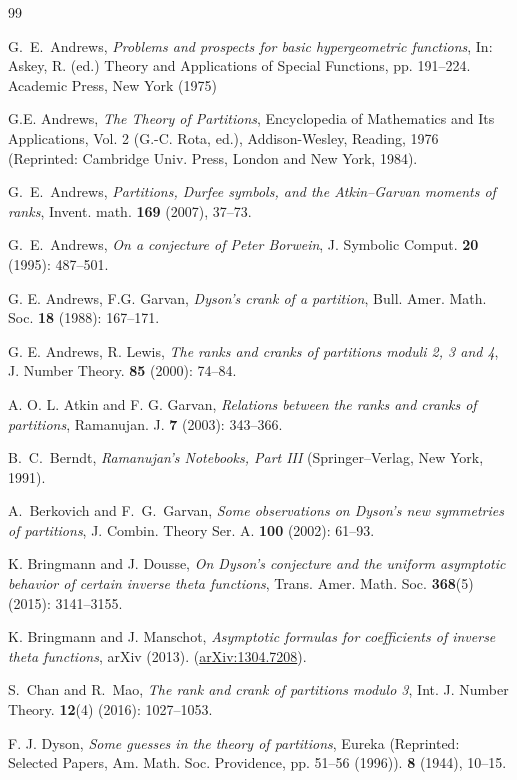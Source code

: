 \documentclass[12pt]{amsart}
\numberwithin{equation}{section}
\theoremstyle{plain}
\theoremstyle{definition}
\begin{document}
\begin{thebibliography}{99}

G.~E.~Andrews, \emph{Problems and prospects for basic hypergeometric functions}, In: Askey, R. (ed.) Theory and Applications of Special Functions, pp. 191--224. Academic Press, New York (1975)

G.E. Andrews, \emph{The Theory of Partitions}, Encyclopedia of Mathematics and Its Applications, Vol. 2 (G.-C. Rota, ed.), Addison-Wesley, Reading, 1976
    (Reprinted: Cambridge Univ. Press, London and New York, 1984).

G.~E.~Andrews, \emph{Partitions, Durfee symbols, and the Atkin--Garvan moments of ranks}, Invent. math. {\bf 169} (2007), 37--73.

G.~E.~Andrews, \emph{On a conjecture of Peter Borwein}, J. Symbolic Comput. {\bf 20} (1995): 487--501.

G. E. Andrews, F.G. Garvan, \emph{Dyson's crank of a partition}, Bull. Amer. Math. Soc. {\bf 18} (1988): 167--171.

G. E. Andrews, R. Lewis, \emph{The ranks and cranks of partitions moduli 2, 3 and 4}, J. Number Theory. {\bf 85} (2000): 74--84.

A. O. L. Atkin and F. G. Garvan, \emph{Relations between the ranks and cranks of partitions}, Ramanujan. J. {\bf 7} (2003): 343--366.

 B.~C.~Berndt, \emph{Ramanujan's Notebooks, Part III} (Springer--Verlag, New York, 1991).

 A.~Berkovich and F.~G.~Garvan, \emph{Some observations on Dyson's new symmetries of partitions}, J. Combin. Theory Ser. A. {\bf 100} (2002): 61--93.

K. Bringmann and J. Dousse, \emph{On Dyson's conjecture and the uniform asymptotic behavior of certain inverse theta functions}, Trans. Amer. Math. Soc. {\bf 368}(5) (2015): 3141--3155.

K. Bringmann and J. Manschot, \emph{Asymptotic formulas for coefficients of inverse theta functions}, arXiv (2013). (\href{http://arXiv.org/abs/1304.7208}{arXiv:1304.7208}).

S.~Chan and R.~Mao, \emph{The rank and crank of partitions modulo 3}, Int. J. Number Theory. \textbf{12}(4) (2016): 1027--1053.

F. J. Dyson, \emph{Some guesses in the theory of partitions}, Eureka (Reprinted: Selected Papers, Am. Math. Soc. Providence, pp. 51--56 (1996)). \textbf{8} (1944), 10--15.


\end{thebibliography}
\end{document}
